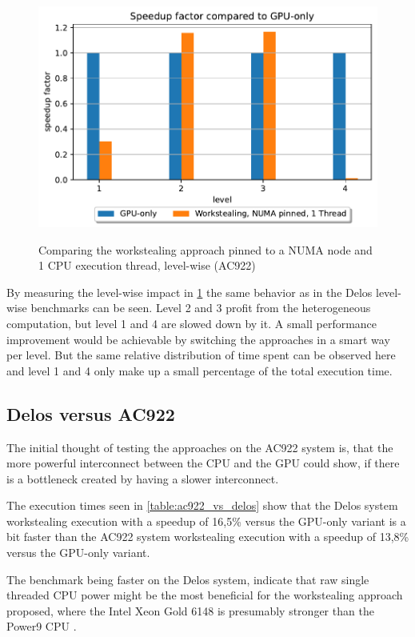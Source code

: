 \begin{figure}[H]
  \caption{Comparing the workstealing approach pinned to a NUMA node and 1 CPU execution thread, level-wise (AC922)}
  \includegraphics[width=\textwidth]{figures/ac922_levelwise.pdf}
  \centering
  \label{fig:levelwise_ac922}
\end{figure}

By measuring the level-wise impact in \ref{fig:levelwise_ac922} the same behavior as in the Delos level-wise benchmarks can be seen. Level 2 and 3 profit from the heterogeneous computation, but level 1 and 4 are slowed down by it. A small performance improvement would be achievable by switching the approaches in a smart way per level. But the same relative distribution of time spent can be observed here and level 1 and 4 only make up a small percentage of the total execution time.

\subsection{Delos versus AC922}
The initial thought of testing the approaches on the AC922 system is, that the more powerful interconnect between the CPU and the GPU could show, if there is a bottleneck created by having a slower interconnect.



The execution times seen in \ref{table:ac922_vs_delos} show that the Delos system workstealing execution with a speedup of 16,5\% versus the GPU-only variant is a bit faster than the AC922 system workstealing execution with a speedup of 13,8\% versus the GPU-only variant.

The benchmark being faster on the Delos system, indicate that raw single threaded CPU power might be the most beneficial for the workstealing approach proposed, where the Intel Xeon Gold 6148 is presumably stronger than the Power9 CPU \cite{POWER9BenchmarksVs}.


